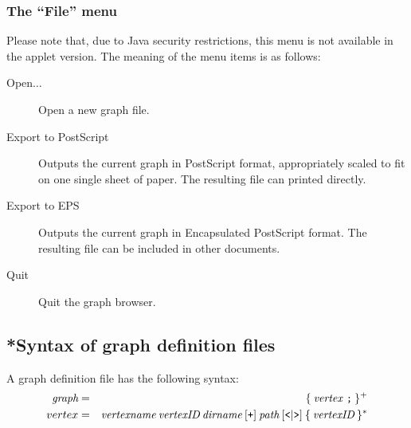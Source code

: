 \subsubsection*{The ``File'' menu}

Please note that, due to Java security restrictions, this menu is not
available in the applet version. The meaning of the menu items is as
follows:
\begin{description}
  
\item[Open$\ldots$] Open a new graph file.
  
\item[Export to PostScript] Outputs the current graph in {\sc
    PostScript} format, appropriately scaled to fit on one single
  sheet of paper.  The resulting file can printed directly.
  
\item[Export to EPS] Outputs the current graph in Encapsulated {\sc
    PostScript} format. The resulting file can be included in other
  documents.

\item[Quit] Quit the graph browser.

\end{description}


\subsection*{*Syntax of graph definition files}

A graph definition file has the following syntax:
\begin{eqnarray*}
  \mbox{\it graph} & = & \{ \: \mbox{\it vertex \tt ;} \: \} ^ + \\
  vertex & = & \mbox{\it vertexname} \: \mbox{\it vertexID} \: \mbox{\it dirname} \: [ \mbox{\tt +} ]
  \: \mbox{\it path} \: [ \mbox{\tt <} | \mbox{\tt >} ] \: \{ \: \mbox{\it vertexID} \: \} ^ *
\end{eqnarray*}

